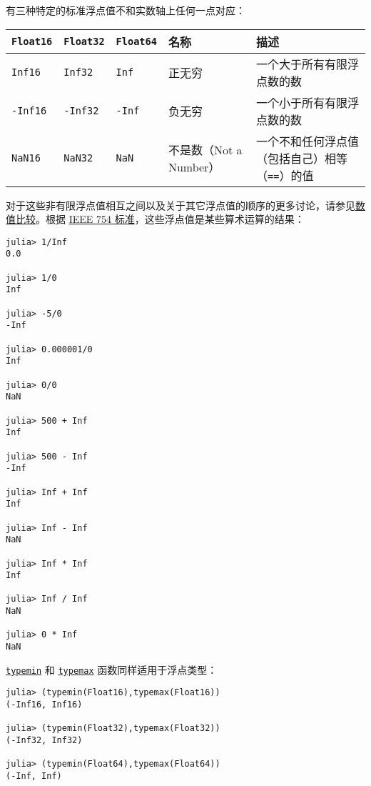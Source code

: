有三种特定的标准浮点值不和实数轴上任何一点对应：




\begin{table}[h]

\begin{tabulary}{\linewidth}{|L|L|L|L|L|}
\hline
\texttt{Float16} & \texttt{Float32} & \texttt{Float64} & 名称 & 描述 \\
\hline
\texttt{Inf16} & \texttt{Inf32} & \texttt{Inf} & 正无穷 & 一个大于所有有限浮点数的数 \\
\hline
\texttt{-Inf16} & \texttt{-Inf32} & \texttt{-Inf} & 负无穷 & 一个小于所有有限浮点数的数 \\
\hline
\texttt{NaN16} & \texttt{NaN32} & \texttt{NaN} & 不是数（Not a Number） & 一个不和任何浮点值（包括自己）相等（\texttt{==}）的值 \\
\hline
\end{tabulary}

\end{table}



对于这些非有限浮点值相互之间以及关于其它浮点值的顺序的更多讨论，请参见\hyperlink{7125151170457482788}{数值比较}。根据 \href{https://en.wikipedia.org/wiki/IEEE\_754\_revision}{IEEE 754 标准}，这些浮点值是某些算术运算的结果：




\begin{verbatim}
julia> 1/Inf
0.0

julia> 1/0
Inf

julia> -5/0
-Inf

julia> 0.000001/0
Inf

julia> 0/0
NaN

julia> 500 + Inf
Inf

julia> 500 - Inf
-Inf

julia> Inf + Inf
Inf

julia> Inf - Inf
NaN

julia> Inf * Inf
Inf

julia> Inf / Inf
NaN

julia> 0 * Inf
NaN
\end{verbatim}



\hyperlink{3613894539247233488}{\texttt{typemin}} 和 \hyperlink{17760305803764597758}{\texttt{typemax}} 函数同样适用于浮点类型：




\begin{verbatim}
julia> (typemin(Float16),typemax(Float16))
(-Inf16, Inf16)

julia> (typemin(Float32),typemax(Float32))
(-Inf32, Inf32)

julia> (typemin(Float64),typemax(Float64))
(-Inf, Inf)
\end{verbatim}



